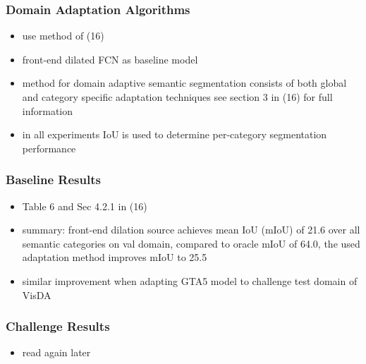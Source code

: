 \subsubsection{Domain Adaptation Algorithms}
\begin{itemize}
	\item use method of (16)
	\item front-end dilated FCN as baseline model
	\item method for domain adaptive semantic segmentation consists of both global and category specific adaptation techniques see section 3 in (16) for full information
	\item in all experiments IoU is used to determine per-category segmentation performance
\end{itemize}

\subsubsection{Baseline Results}
\begin{itemize}
	\item Table 6 and Sec 4.2.1 in (16)
	\item summary: front-end dilation source achieves mean IoU (mIoU) of 21.6 over all semantic categories on val domain, compared to oracle mIoU of 64.0, the used adaptation method improves mIoU to 25.5
	\item similar improvement when adapting GTA5 model to challenge test domain of VisDA
\end{itemize}

\subsubsection{Challenge Results}
\begin{itemize}
	\item read again later
\end{itemize}